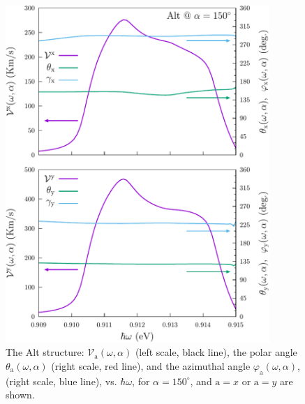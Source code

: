 \documentclass[floatfix,prb,aps,superscriptaddress,showpacs,11pt,preprint,letterpaper]{revtex4}
\def\tama{10cm}
\begin{document}
\begin{figure}[tb]
\centering
\includegraphics[width=\tama]{figures/fig10}
\caption{The Alt structure: $\mathcal{V}_{\mathrm{a}}
(\omega,\alpha)$ (left scale, black line), the polar angle $\theta_{\mathrm{a}}
(\omega,\alpha)$ (right scale, red line), and the azimuthal angle
$\varphi_{\mathrm{a}} (\omega,\alpha)$, (right scale, blue line), vs.
$\hbar\omega$, for $\alpha=150^\circ$, and $\mathrm{a}=x$ or $\mathrm{a}=y$ are
shown.}
\label{fig:alt-vx-vy-w2}
\end{figure}
\end{document}
